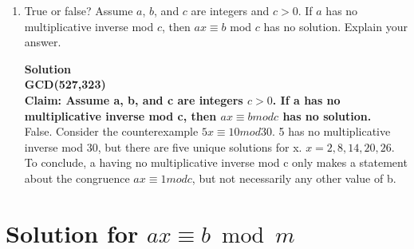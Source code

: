 \documentclass[11pt]{article}
\newcommand*{\Question}[1]{\section{#1}}
\newenvironment{Parts}{\begin{enumerate}[label=(\alph*)]}{\end{enumerate}}
\newcommand*{\Part}{\item}
\begin{document}
\begin{Parts}
\Part True or false? Assume $a$, $b$, and $c$ are integers and $c>0$. If $a$ has no multiplicative inverse mod $c$, then $ax \equiv b$ mod $c$ has no solution. Explain your answer.
\begin{mdframed} \textbf{Solution} \\
\textbf{GCD(527,323)} \\
\textbf{Claim: Assume a, b, and c are integers $c>0$. If a has no multiplicative inverse mod c, then $ax \equiv bmodc$ has no solution.}\\
False. Consider the counterexample $5x \equiv 10mod30$. 5 has no multiplicative inverse mod 30, but there are five unique solutions for x. $x=2,8,14,20,26$. To conclude, a having no multiplicative inverse mod c only makes a statement about the congruence $ax \equiv 1modc$, but not necessarily any other value of b. 
\end{mdframed}
\end{Parts}

\pagebreak 

\Question{Solution for $ax \equiv b \bmod m$}
\end{document}
